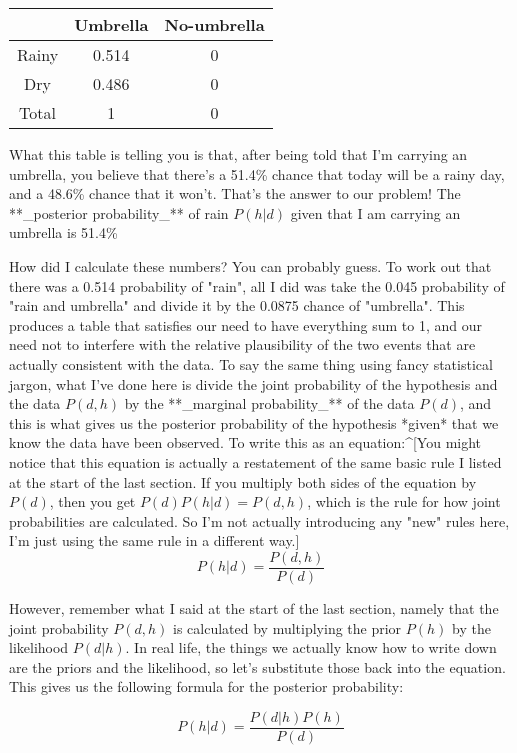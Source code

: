 \begin{center}
\begin{tabular}{c|cc}
& Umbrella & No-umbrella  \\ \hline
Rainy & 0.514 & 0   \\
Dry & 0.486 & 0    \\ \hline
Total & 1 & 0 
\end{tabular}
\end{center}


What this table is telling you is that, after being told that I'm carrying an umbrella, you believe that there's a 51.4\% chance that today will be a rainy day, and a 48.6\% chance that it won't. That's the answer to our problem! The **_posterior probability_** of rain $P(h|d)$ given that I am carrying an umbrella is 51.4\%

How did I calculate these numbers? You can probably guess. To work out that there was a 0.514 probability of "rain", all I did was take the 0.045 probability of "rain and umbrella" and divide it by the 0.0875 chance of "umbrella". This produces a table that satisfies our need to have everything sum to 1, and our need not to interfere with the relative plausibility of the two events that are actually consistent with the data. To say the same thing using fancy statistical jargon, what I've done here is divide the joint probability of the hypothesis and the data $P(d,h)$ by the **_marginal probability_** of the data $P(d)$, and this is what gives us the posterior probability of the hypothesis *given* that we know the data have been observed. To write this as an equation:^[You might notice that this equation is actually a restatement of the same basic rule I listed at the start of the last section. If you multiply both sides of the equation by $P(d)$, then you get $P(d) P(h| d) = P(d,h)$, which is the rule for how joint probabilities are calculated. So I'm not actually introducing any "new" rules here, I'm just using the same rule in a different way.]
$$
P(h | d) = \frac{P(d,h)}{P(d)}
$$



However, remember what I said at the start of the last section, namely that the joint probability $P(d,h)$ is calculated by multiplying the prior $P(h)$ by the likelihood $P(d|h)$. In real life, the things we actually know how to write down are the priors and the likelihood, so let's substitute those back into the equation. This gives us the following formula for the posterior probability:

$$
P(h | d) = \frac{P(d|h) P(h)}{P(d)}
$$


